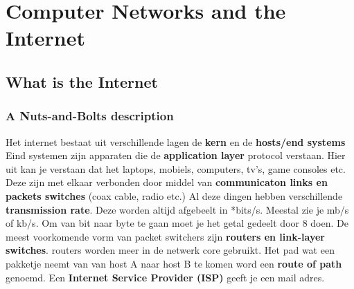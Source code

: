 \section{Computer Networks and the Internet}

\subsection{What is the Internet}

\subsubsection{A Nuts-and-Bolts description}
Het internet bestaat uit verschillende lagen de \textbf{kern} en de \textbf{hosts/end systems} Eind systemen zijn apparaten die de \textbf{application layer} protocol verstaan. Hier uit kan je verstaan dat het laptops, mobiels, computers, tv's, game consoles etc. Deze zijn met elkaar verbonden door middel van \textbf{communicaton links en packets switches} (coax cable, radio etc.) Al deze dingen hebben verschillende \textbf{transmission rate}. Deze worden altijd afgebeelt in *bits/s. Meestal zie je mb/s of kb/s. Om van bit naar byte te gaan moet je het getal gedeelt door 8 doen.
\newline
De meest voorkomende vorm van packet switchers zijn \textbf{routers en link-layer switches}. routers worden meer in de netwerk core gebruikt. Het pad wat een pakketje neemt van van host A naar host B te komen word een \textbf{route of path} genoemd.
\newline
Een \textbf{Internet Service Provider (ISP)} geeft je een mail adres.